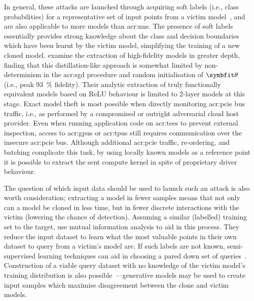 In general, these attacks are launched through acquiring soft labels (i.e., class probabilities) for a representative set of input points from a victim model~\parencite{DBLP:conf/uss/TramerZJRR16}, and are also applicable to more models than \glspl{acr:nn}.
The presence of soft labels essentially provides strong knowledge about the class and decision boundaries which have been learnt by the victim model, simplifying the training of a new cloned model.
\Textcite{DBLP:conf/uss/JagielskiCBKP20} examine the extraction of high-fidelity models in greater depth, finding that this distillation-like approach is somewhat limited by non-determinism in the \gls{acr:sgd} procedure and random initialisation of $\wvec{}$ (i.e., peak \qty{93}{\percent} fidelity).
Their analytic extraction of truly functionally equivalent models based on ReLU behaviour is limited to 2-layer models at this stage.
Exact model theft is most possible when directly monitoring \gls{acr:pcie} bus traffic, i.e., as performed by a compromised or outright adversarial cloud host provider.
Even when running application code on \glspl{acr:tee} to prevent external inspection, access to \glspl{acr:gpu} or \glspl{acr:tpu} still requires communication over the insecure \gls{acr:pcie} bus.
Although additional \gls{acr:pcie} traffic, re-ordering, and batching complicate this task, by using locally known models as a reference point it is possible to extract the sent compute kernel in spite of proprietary driver behaviour.


The question of which input data should be used to launch such an attack is also worth consideration; extracting a model in fewer samples means that not only can a model be cloned in less time, but in fewer discrete interactions with the victim (lowering the chance of detection).
Assuming a similar (labelled) training set to the target, \textcite{DBLP:conf/uss/HeM0HH21} use mutual information analysis to aid in this process.
They reduce the input dataset to learn what the most valuable points in their own dataset to query from a victim's model are.
If such labels are not known, semi-supervised learning techniques can aid in choosing a pared down set of queries~\parencite{DBLP:conf/uss/JagielskiCBKP20}.
Construction of a viable query dataset with no knowledge of the victim model's training distribution is also possible~\parencite{DBLP:conf/cvpr/TruongMWP21}---generative models may be used to create input samples which maximise disagreement between the clone and victim models.

